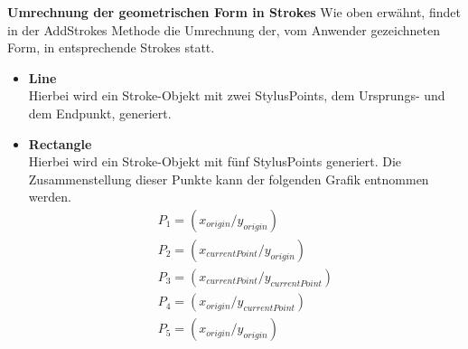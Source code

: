 \textbf{Umrechnung der geometrischen Form in Strokes}
Wie oben erwähnt, findet in der AddStrokes Methode die Umrechnung der, vom Anwender gezeichneten Form, in entsprechende Strokes statt. 
\begin{itemize}
\item \textbf{Line}\\ 
Hierbei wird ein Stroke-Objekt mit zwei StylusPoints, dem Ursprungs- und dem Endpunkt, generiert.
\item \textbf{Rectangle}\\ 
Hierbei wird ein Stroke-Objekt mit fünf StylusPoints generiert. Die Zusammenstellung dieser Punkte kann der folgenden Grafik entnommen werden.
\begin{align}
P_1 = (x_{origin} / y_{origin})\\
P_2 = (x_{currentPoint} / y_{origin})\\
P_3 = (x_{currentPoint} / y_{currentPoint})\\
P_4 = (x_{origin} / y_{currentPoint})\\
P_5 = (x_{origin} / y_{origin})
\end{align}


\end{itemize}
